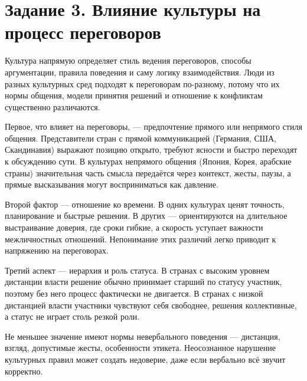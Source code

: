 \documentclass[14pt,a4paper]{extarticle}
\begin{document}
\section{Задание 3. Влияние культуры на процесс переговоров}
\begin{sloppypar}
Культура напрямую определяет стиль ведения переговоров, способы аргументации,
    правила поведения и саму логику взаимодействия. Люди из разных культурных
    сред подходят к переговорам по-разному, потому что их нормы общения, модели
    принятия решений и отношение к конфликтам существенно различаются.

    Первое, что влияет на переговоры, — предпочтение прямого или непрямого
    стиля общения. Представители стран с прямой коммуникацией (Германия, США,
    Скандинавия) выражают позицию открыто, требуют ясности и быстро переходят к
    обсуждению сути. В культурах непрямого общения (Япония, Корея, арабские
    страны) значительная часть смысла передаётся через контекст, жесты, паузы,
    а прямые высказывания могут восприниматься как давление.

    Второй фактор — отношение ко времени. В одних культурах ценят точность,
    планирование и быстрые решения. В других — ориентируются на длительное
    выстраивание доверия, где сроки гибкие, а скорость уступает важности
    межличностных отношений. Непонимание этих различий легко приводит к
    напряжению на переговорах.

    Третий аспект — иерархия и роль статуса. В странах с высоким уровнем
    дистанции власти решение обычно принимает старший по статусу участник,
    поэтому без него процесс фактически не двигается. В странах с низкой
    дистанцией власти участники чувствуют себя свободнее, решения коллективные,
    а статус не играет столь резкой роли.

    Не меньшее значение имеют нормы невербального поведения — дистанция,
    взгляд, допустимые жесты, особенности этикета. Неосознанное нарушение
    культурных правил может создать недоверие, даже если вербально всё звучит
    корректно.
\end{sloppypar}
\end{document}
